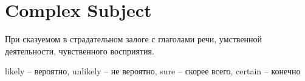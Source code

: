 \section{Complex Subject}

При сказуемом в страдательном залоге с глаголами речи, умственной деятельности, чувственного восприятия.




likely -- вероятно, unlikely -- не вероятно, sure -- скорее всего, certain -- конечно



